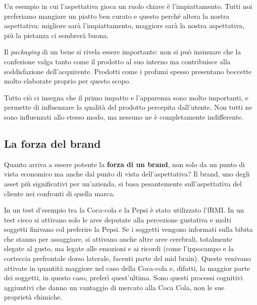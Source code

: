 \begin{example}[Impiattamento]
Un esempio in cui l'aspettativa gioca un ruolo chiave è l'impiattamento.
Tutti noi preferiamo mangiare un piatto ben curato e questo perché altera la
nostra aspettativa: migliore sarà l'impiattamento, maggiore sarà la nostra
aspettativa, più la pietanza ci sembrerà buona. 
\end{example}

\begin{example}[Packaging]
Il \emph{packaging} di un bene si rivela essere importante: non si può 
insinuare che la confezione valga tanto come il prodotto al suo interno ma 
contribuisce alla soddisfazione dell'acquirente. Prodotti come i profumi spesso 
presentano boccette molto elaborate proprio per questo scopo. 
\end{example}

Tutto ciò ci insegna che il primo impatto e l'apparenza sono molto importanti,
e permette di influenzare la qualità del prodotto percepita dall'utente. Non
tutti ne sono influenzati allo stesso modo, ma nessuno ne è completamente
indifferente.

\subsection{La forza del brand}

Quanto arriva a essere potente la \textbf{forza di un brand}, non solo da un
punto di vista economico ma anche dal punto di vista dell'aspettativa?
Il brand, uno degli asset più significativi per un'azienda, si basa
pesantemente sull'aspettativa del cliente nei confronti di quella marca.

\begin{example}
In un test d'esempio tra la Coca-cola e la Pepsi è stato utilizzato l'fRMI. In
un test cieco si attivano solo le aree deputate alla percezione gustativa e
molti soggetti finivano col preferire la Pepsi. Se i soggetti vengono
informati sulla bibita che stanno per assaggiare, si attivano anche altre
aree cerebrali, totalmente slegate al gusto, ma legate alle emozioni e ai
ricordi (come l'ippocampo e la corteccia prefrontale dorso laterale, facenti
parte del mid brain). Queste venivano attivate in quantità maggiore nel caso
della Coca-cola e, difatti, la maggior parte dei soggetti, in questo caso,
preferì quest'ultima. Sono questi processi cognitivi aggiuntivi che danno un
vantaggio di mercato alla Coca Cola, non le sue proprietà chimiche. 
\end{example}


